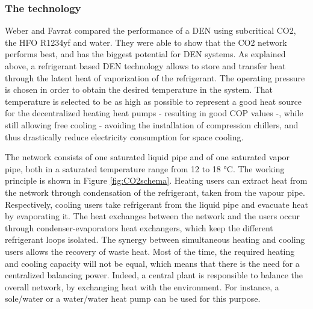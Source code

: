 \documentclass{article}
\begin{document}

\subsubsection{The technology}
Weber and Favrat \cite{weberConventionalAdvancedCO22010a} compared the performance of a DEN using subcritical CO2, the HFO R1234yf and water. They were able to show that the CO2 network performs best, and has the biggest potential for DEN systems\cite{henchozPotentialRefrigerantBased}. 
As explained above, a refrigerant based DEN technology allows to store and transfer heat through the latent heat of vaporization of the refrigerant. The operating pressure is chosen in order to obtain the desired temperature in the system. That temperature is selected to be as high as possible to represent a good heat source for the decentralized heating heat pumps - resulting in good COP values -, while still allowing free cooling - avoiding the installation of compression chillers, and thus drastically reduce electricity consumption for space cooling. 

The network consists of one saturated liquid pipe and of one saturated vapor pipe, both in a saturated temperature range from 12 to 18 \si{\celsius}\cite{suciuEnergyIntegrationCO22018}.
The working principle is shown in Figure \ref{fig:CO2schema}. Heating users can extract heat from the network through condensation of the refrigerant, taken from the vapour pipe. Respectively, cooling users take refrigerant from the liquid pipe and evacuate heat by evaporating it. The heat exchanges between the network and the users occur through condenser-evaporators heat exchangers, which keep the different refrigerant loops isolated\cite{henchozPotentialRefrigerantBased}. The synergy between simultaneous heating and cooling users allows the recovery of waste heat. Most of the time, the required heating and cooling capacity will not be equal, which means that there is the need for a centralized balancing power. Indeed, a central plant is responsible to balance the overall network, by exchanging heat with the environment. For instance, a sole/water or a water/water heat pump can be used for this purpose.\\

\end{document}
